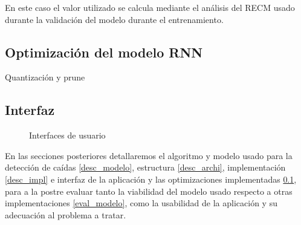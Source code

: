 En este caso el valor utilizado se calcula mediante el análisis del RECM usado durante la validación del modelo durante el entrenamiento. 


\subsection{Optimización del modelo RNN}\label{desc_optim}

Quantización y prune


\subsection{Interfaz}


\begin{figure}[!ht]
  \centering
  \iffalse
  \begin{subfigure}[b]{}
      \centering
      \texttt{[image: appActivity.png]}
      \caption{Aplicación de gestión}
      \label{fig:uiActivity}
  \end{subfigure}
  \hfill
  \begin{subfigure}[b]{}
      \centering
      \texttt{[image: appWatchface.png]}
      \caption{\textit{Watchface}}
      \label{fig:uiWatchface}
  \end{subfigure}
\fi
{}
     \caption{\label{fig:uiApps} Interfaces de usuario}
     \hfill
{}

\end{figure}


En las secciones posteriores detallaremos el algoritmo y modelo usado para la detección de caídas \ref{desc_modelo}, estructura \ref{desc_archi}, implementación \ref{desc_impl} e interfaz de la aplicación y las optimizaciones implementadas \ref{desc_optim}, para a la postre evaluar tanto la viabilidad del modelo usado respecto a otras implementaciones \ref{eval_modelo}, como la usabilidad de la aplicación y su adecuación al problema a tratar.




